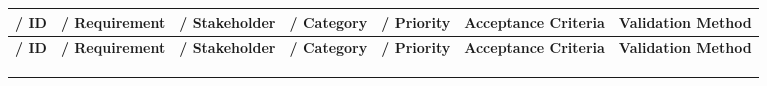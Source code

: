 \documentclass[10pt,letterpaper]{article}
\renewcommand\arraystretch{1.25}
\begin{document}
\begin{center}
\begingroup
\setlength\tabcolsep{2.0pt}
\scriptsize
\renewcommand\arraystretch{1.55}
\begin{longtable}{|>{\raggedright\arraybackslash}p{0.834in}|>{\raggedright\arraybackslash}p{0.834in}|>{\raggedright\arraybackslash}p{0.834in}|>{\raggedright\arraybackslash}p{0.834in}|>{\raggedright\arraybackslash}p{0.834in}|>{\raggedright\arraybackslash}p{0.834in}|>{\raggedright\arraybackslash}p{0.834in}|}
\hline
\rowcolor{light}
\textbf{/ ID} & \textbf{/ Requirement} & \textbf{/ Stakeholder} & \textbf{/ Category} & \textbf{/ Priority} & \textbf{Acceptance Criteria} & \textbf{Validation Method} \\ \hline
\endfirsthead
\hline\rowcolor{light} \textbf{/ ID} & \textbf{/ Requirement} & \textbf{/ Stakeholder} & \textbf{/ Category} & \textbf{/ Priority} & \textbf{Acceptance Criteria} & \textbf{Validation Method} \\ \hline
\endhead
\rule{0pt}{11pt}\hspace{0pt} & \rule{0pt}{11pt}\hspace{0pt} & \rule{0pt}{11pt}\hspace{0pt} & \rule{0pt}{11pt}\hspace{0pt} & \rule{0pt}{11pt}\hspace{0pt} & \rule{0pt}{11pt}\hspace{0pt} & \rule{0pt}{11pt}\hspace{0pt} \\ \hline
\rule{0pt}{11pt}\hspace{0pt} & \rule{0pt}{11pt}\hspace{0pt} & \rule{0pt}{11pt}\hspace{0pt} & \rule{0pt}{11pt}\hspace{0pt} & \rule{0pt}{11pt}\hspace{0pt} & \rule{0pt}{11pt}\hspace{0pt} & \rule{0pt}{11pt}\hspace{0pt} \\ \hline
\rule{0pt}{11pt}\hspace{0pt} & \rule{0pt}{11pt}\hspace{0pt} & \rule{0pt}{11pt}\hspace{0pt} & \rule{0pt}{11pt}\hspace{0pt} & \rule{0pt}{11pt}\hspace{0pt} & \rule{0pt}{11pt}\hspace{0pt} & \rule{0pt}{11pt}\hspace{0pt} \\ \hline

\end{longtable}
\end{center}
\end{document}
